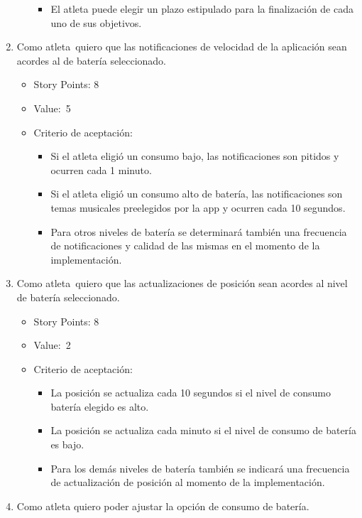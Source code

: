 \begin{enumerate}
\begin{itemize}
    \begin{itemize}
    \itemsep1pt\parskip0pt
    \item
      El atleta puede elegir un plazo estipulado para la finalización de
      cada uno de sus objetivos.
    \end{itemize}
  \end{itemize}
\item
  Como atleta~quiero que las notificaciones de velocidad de la
  aplicación sean acordes al de batería seleccionado.

  \begin{itemize}
  \item
    Story Points: 8
  \item
    Value:~5
  \item
    Criterio de aceptación:

    \begin{itemize}
    \item
      Si el atleta eligió un consumo bajo, las notificaciones son
      pitidos y ocurren cada 1 minuto.
    \item
      Si el atleta eligió un consumo alto de batería, las notificaciones
      son temas musicales preelegidos por la app y ocurren cada 10
      segundos.
    \item
      Para otros niveles de batería se determinará también una
      frecuencia de notificaciones y calidad de las mismas en el momento
      de la implementación.
    \end{itemize}
  \end{itemize}
\item
  Como atleta~quiero que las actualizaciones de posición sean acordes al
  nivel de batería seleccionado.

  \begin{itemize}
  \item
    Story Points: 8
  \item
    Value:~2
  \item
    Criterio de aceptación:

    \begin{itemize}
    \itemsep1pt\parskip0pt
    \item
      La posición se actualiza cada 10 segundos si el nivel de consumo
      batería elegido es alto.
    \item
      La posición se actualiza cada minuto si el nivel de consumo de
      batería es bajo.
    \item
      Para los demás niveles de batería también se indicará una
      frecuencia de actualización de posición al momento de la
      implementación.
    \end{itemize}
  \end{itemize}
\item
  Como atleta quiero poder ajustar la opción de consumo de batería.


\end{enumerate}
